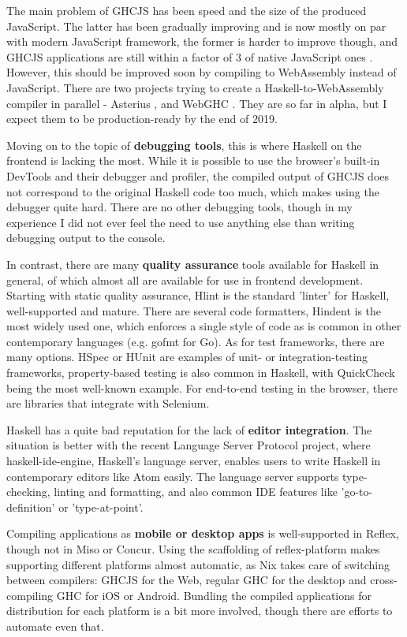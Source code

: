 \documentclass[english,odsaz]{fitthesis}
\begin{document}
The main problem of GHCJS has been speed and the size of the produced
JavaScript. The latter has been gradually improving and is now mostly on par
with modern JavaScript framework, the former is harder to improve though, and
GHCJS applications are still within a factor of 3 of native JavaScript ones
\cite{nanda_bench}. However, this should be improved soon by compiling to
WebAssembly instead of JavaScript. There are two projects trying to create a
Haskell-to-WebAssembly compiler in parallel - Asterius \cite{asterius}, and WebGHC
\cite{webghc}. They are so far in alpha, but I expect them to be production-ready
by the end of 2019.

Moving on to the topic of \textbf{debugging tools}, this is where Haskell on the frontend
is lacking the most. While it is possible to use the browser's built-in DevTools
and their debugger and profiler, the compiled output of GHCJS does not
correspond to the original Haskell code too much, which makes using the debugger
quite hard. There are no other debugging tools, though in my experience I did
not ever feel the need to use anything else than writing debugging output to the
console.

In contrast, there are many \textbf{quality assurance} tools available for Haskell in
general, of which almost all are available for use in frontend
development. Starting with static quality assurance, Hlint is the standard
'linter' for Haskell, well-supported and mature. There are several code
formatters, Hindent is the most widely used one, which enforces a single style
of code as is common in other contemporary languages (e.g. gofmt for Go). As for
test frameworks, there are many options. HSpec or HUnit are examples of unit- or
integration-testing frameworks, property-based testing is also common in
Haskell, with QuickCheck \cite{claessen2011quickcheck} being the most well-known
example. For end-to-end testing in the browser, there are libraries that
integrate with Selenium.

Haskell has a quite bad reputation for the lack of \textbf{editor integration}. The
situation is better with the recent Language Server Protocol project, where
haskell-ide-engine, Haskell's language server, enables users to write Haskell in
contemporary editors like Atom easily. The language server supports
type-checking, linting and formatting, and also common IDE features like
'go-to-definition' or 'type-at-point'.

Compiling applications as \textbf{mobile or desktop apps} is well-supported in Reflex,
though not in Miso or Concur. Using the scaffolding of reflex-platform makes
supporting different platforms almost automatic, as Nix takes care of switching
between compilers: GHCJS for the Web, regular GHC for the desktop and
cross-compiling GHC for iOS or Android. Bundling the compiled applications for
distribution for each platform is a bit more involved, though there are efforts
to automate even that.
\end{document}
